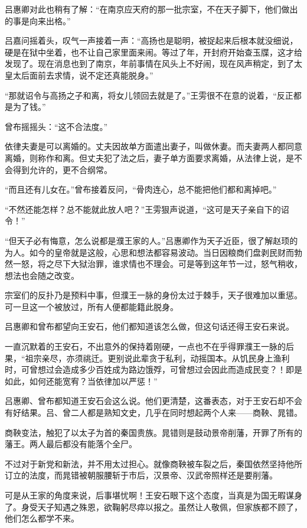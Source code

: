 吕惠卿对此也稍有了解：“在南京应天府的那一批宗室，不在天子脚下，他们做出的事是向来出格。”

吕嘉问摇着头，叹气一声接着一声：“高扬也是聪明，被捉起来后根本就没细说，硬是在狱中坐着，也不让自己家里面来闹。等过了年，开封府开始查玉牒，这才给发现了。现在消息也到了南京，年前事情在风头上不好闹，现在风声稍定，到了太皇太后面前去求情，说不定还真能脱身。”

“那就诏令与高扬之子和离，将女儿领回去就是了。”王雱很不在意的说着，“反正都是为了钱。”

曾布摇摇头：“这不合法度。”

依律夫妻是可以离婚的。丈夫因故单方面遣出妻子，叫做休妻。而夫妻两人都同意离婚，则称作和离。但丈夫犯了法之后，妻子单方面要求离婚，从法律上说，是不会得到允许的，更不合纲常。

“而且还有儿女在。”曾布接着反问，“骨肉连心，总不能把他们都和离掉吧。”

“不然还能怎样？总不能就此放人吧？”王雱狠声说道，“这可是天子亲自下的诏令！”

“但天子必有悔意，怎么说都是濮王家的人。”吕惠卿作为天子近臣，很了解赵顼的为人。如今的皇帝就是这般，心思和想法都容易波动。当日因粮商们盘剥民财而勃然一怒，将之尽下大狱治罪，谁求情也不理会。可是等到这年节一过，怒气稍收，想法也会随之改变。

宗室们的反扑乃是预料中事，但濮王一脉的身份太过于棘手，天子很难加以重惩。可一旦这一个被放过，所有人便都能籍此脱身。

吕惠卿和曾布都望向王安石，他们都知道该怎么做，但这句话还得王安石来说。

一直沉默着的王安石，不出意外的保持着刚硬，一点也不在乎得罪濮王一脉的后果，“祖宗亲尽，亦须祧迁。更别说此辈贪于私利，动摇国本。从饥民身上渔利时，可曾想过会造成多少百姓成为路边饿殍，可曾想过会因此而造成民变？！即是如此，如何还能宽宥？当依律加以严惩！”

吕惠卿、曾布都知道王安石会这么说。他们更清楚，这番表态，对于王安石却不会有好结果。吕、曾二人都是熟知文史，几乎在同时想起两个人来——商鞅、晁错。

商鞅变法，触犯了以太子为首的秦国贵族。晁错则是鼓动景帝削藩，开罪了所有的藩王。两人最后都没有能落个全尸。

不过对于新党和新法，并不用太过担心。就像商鞅被车裂之后，秦国依然坚持他所订立的法度，而晁错被朝服腰斩于市后，汉景帝、汉武帝照样还是要削藩。

可是从王家的角度来说，后事堪忧啊！王安石眼下这个态度，当真是为国无暇谋身了。身受天子知遇之殊恩，欲鞠躬尽瘁以报之。虽然让人敬佩，但家族都不顾了，他们怎么都学不来。

